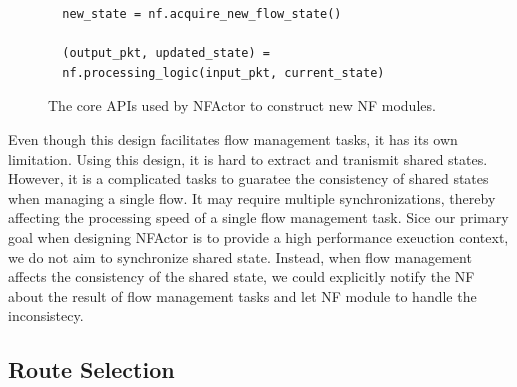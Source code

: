 \begin{figure}[!h]
\lstset{language=Python, showspaces=false,
        showstringspaces=false, tabsize=2, breaklines=true, basicstyle=\scriptsize,
}

\begin{verbatim}
  new_state = nf.acquire_new_flow_state()

  (output_pkt, updated_state) =
  nf.processing_logic(input_pkt, current_state)
\end{verbatim}

\caption{The core APIs used by NFActor to construct new NF modules.}
\label{fig:api}
\end{figure}


Even though this design facilitates flow management tasks, it has its own limitation. Using this design, it is hard to extract and tranismit shared states. However, it is a complicated tasks to guaratee the consistency of shared states when managing a single flow. It may require multiple synchronizations, thereby affecting the processing speed of a single flow management task. Sice our primary goal when designing NFActor is to provide a high performance exeuction context, we do not aim to synchronize shared state. Instead, when flow management affects the consistency of the shared state, we could explicitly notify the NF about the result of flow management tasks and let NF module to handle the inconsistecy.



\subsection{Route Selection}


